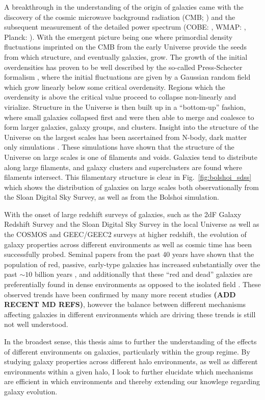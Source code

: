 A breakthrough in the understanding of the origin of galaxies came
with the discovery of the cosmic microwave background radiation (CMB;
\citealt{penzias1965}) and the subsequent measurement of the detailed
power spectrum (COBE: \citealt{mather1990}, WMAP:
\citealt{hinshaw2003}, Planck: \citealt{planck2014}).  With the
emergent picture being one where primordial density fluctuations
imprinted on the CMB from the early Universe provide the seeds from
which structure, and eventually galaxies, grow.  The growth of the
initial overdensities has proven to be well described by the so-called
Press-Schecter formalism \citep{press1974}, where the initial
fluctuations are given by a Gaussian random field which grow linearly
below some critical overdensity.  Regions which the overdensity is
above the critical value proceed to collapse non-linearly and
virialize.  Structure in the Universe is then built up in a
``bottom-up'' fashion, where small galaxies collapsed first and were
then able to merge and coalesce to form larger galaxies, galaxy
groups, and clusters.  Insight into the structure of the Universe on
the largest scales has been ascertained from N-body, dark matter only
simulations \citep{springel2005, klypin2011}.  These simulations
have shown that the structure of the Universe on large scales is one
of filaments and voids.  Galaxies tend to distribute along large
filaments, and galaxy clusters and superclusters are found where
filaments intersect.  This filamentary structure is clear in
Fig.~\ref{fig:bolshoi_sdss} which shows the distribution of galaxies
on large scales both observationally from the Sloan Digital Sky
Survey, as well as from the Bolshoi simulation.
\par
With the onset of large redshift surveys of galaxies, such as the 2dF
Galaxy Redshift Survey \citep{folkes1999} and the Sloan Digital Sky Survey
\citep{york2000} in the local Universe as well as the COSMOS
\citep{scoville2007} and GEEC/GEEC2 \citep{wilman2005, balogh2011} surveys at higher
redshift, the evolution of galaxy properties across different
environments as well as cosmic time has been successfully probed.
Seminal papers from the past 40 years have shown that the population
of red, passive, early-type galaxies has increased substantially over
the past $\sim\!10$ billion years \citep{butcher1978}, and additionally
that these ``red and dead'' galaxies are preferentially found in dense
environments as opposed to the isolated field \citep{dressler1980}.
These observed trends have been confirmed by many more recent studies \citep{ellingson2001, loh2008, urquhart2010} \textbf{(ADD RECENT MD REFS)},
however the balance between different mechanisms affecting galaxies in
different environments which are driving these trends is still not well understood.
\par
In the broadest sense, this thesis aims to further the understanding of the effects of different environments on galaxies, particularly within the group regime.  By studying galaxy properties across different halo environments, as well as different environments within a given halo, I look to further elucidate which mechanisms are efficient in which environments and thereby extending our knowlege regarding galaxy evolution.

